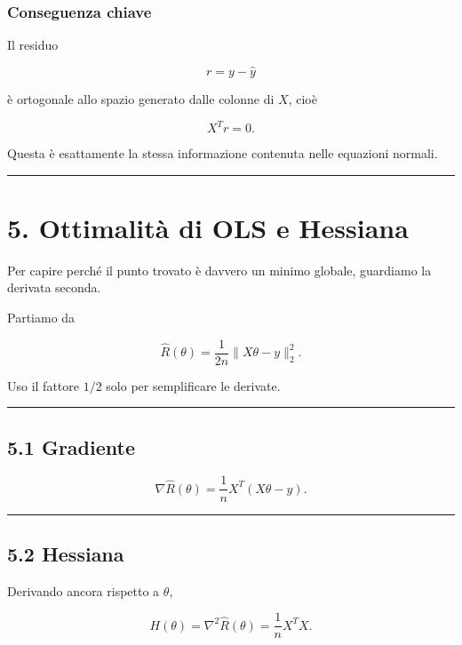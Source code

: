 \documentclass{article}
\begin{document}
\subsubsection{Conseguenza chiave}\label{conseguenza-chiave}

Il residuo

\[
r=y-\hat y
\]

è ortogonale allo spazio generato dalle colonne di \(X\), cioè

\[
X^Tr=0.
\]

Questa è esattamente la stessa informazione contenuta nelle equazioni
normali.

\begin{center}\rule{0.5\linewidth}{0.5pt}\end{center}

\section{5. Ottimalità di OLS e
Hessiana}\label{ottimalituxe0-di-ols-e-hessiana}

Per capire perché il punto trovato è davvero un minimo globale,
guardiamo la derivata seconda.

Partiamo da

\[
\hat R(\theta)=\frac{1}{2n}\|X\theta-y\|_2^2.
\]

Uso il fattore \(1/2\) solo per semplificare le derivate.

\begin{center}\rule{0.5\linewidth}{0.5pt}\end{center}

\subsection{5.1 Gradiente}\label{gradiente}

\[
\nabla \hat R(\theta)=\frac{1}{n}X^T(X\theta-y).
\]

\begin{center}\rule{0.5\linewidth}{0.5pt}\end{center}

\subsection{5.2 Hessiana}\label{hessiana}

Derivando ancora rispetto a \(\theta\),

\[
H(\theta)=\nabla^2 \hat R(\theta)=\frac{1}{n}X^TX.
\]
\end{document}

